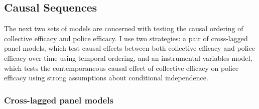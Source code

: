 \documentclass [11pt, proquest] {uwthesis}[2015/03/03]
\begin{document}
\hypertarget{causal-sequences}{%
\subsection{Causal Sequences}\label{causal-sequences}}

The next two sets of models are concerned with testing the causal ordering of collective efficacy and police efficacy. I use two strategies: a pair of cross-lagged panel models, which test causal effects between both collective efficacy and police efficacy over time using temporal ordering, and an instrumental variables model, which tests the contemporaneous causal effect of collective efficacy on police efficacy using strong assumptions about conditional independence.

\hypertarget{cross-lagged-panel-models}{%
\subsubsection{Cross-lagged panel models}\label{cross-lagged-panel-models}}
\end{document}
